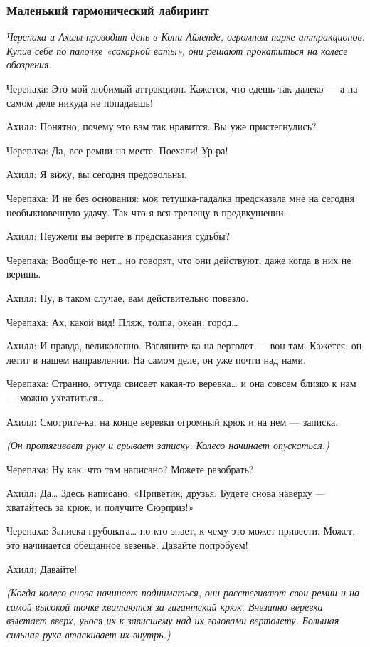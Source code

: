 \subsubsection{Маленький гармонический лабиринт}

\emph{Черепаха и Ахилл проводят день в Кони Айленде, огромном парке аттракционов. Купив себе по палочке «сахарной ваты», они решают прокатиться на колесе обозрения.}

Черепаха: Это мой любимый аттракцион. Кажется, что едешь так далеко --- а на самом деле никуда не попадаешь!

Ахилл: Понятно, почему это вам так нравится. Вы уже пристегнулись?

Черепаха: Да, все ремни на месте. Поехали! Ур-ра!

Ахилл: Я вижу, вы сегодня предовольны.

Черепаха: И не без основания: моя тетушка-гадалка предсказала мне на сегодня необыкновенную удачу. Так что я вся трепещу в предвкушении.

Ахилл: Неужели вы верите в предсказания судьбы?

Черепаха: Вообще-то нет\ldots{} но говорят, что они действуют, даже когда в них не веришь.

Ахилл: Ну, в таком случае, вам действительно повезло.

Черепаха: Ах, какой вид! Пляж, толпа, океан, город\ldots{}

Ахилл: И правда, великолепно. Взгляните-ка на вертолет --- вон там. Кажется, он летит в нашем направлении. На самом деле, он уже почти над нами.

Черепаха: Странно, оттуда свисает какая-то веревка\ldots{} и она совсем близко к нам --- можно ухватиться\ldots{}

Ахилл: Смотрите-ка: на конце веревки огромный крюк и на нем --- записка.

\emph{(Он протягивает руку и срывает записку. Колесо начинает опускаться.)}

Черепаха: Ну как, что там написано? Можете разобрать?

Ахилл: Да\ldots{} Здесь написано: «Приветик, друзья. Будете снова наверху --- хватайтесь за крюк, и получите Сюрприз!»

Черепаха: Записка грубовата\ldots{} но кто знает, к чему это может привести. Может, это начинается обещанное везенье. Давайте попробуем!

Ахилл: Давайте!

\emph{(Когда колесо снова начинает подниматься, они расстегивают свои ремни и на самой высокой точке хватаются за гигантский крюк. Внезапно веревка взлетает вверх, унося их к зависшему над их головами вертолету. Большая сильная рука втаскивает их внутрь.)}

